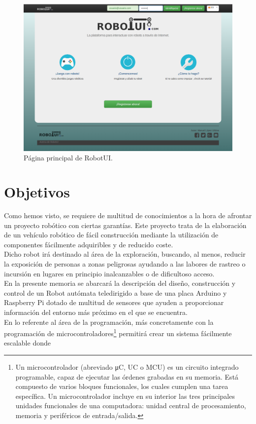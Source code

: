 \begin{figure}[H]
  \begin{center}
    \includegraphics[scale=0.3]{imagenes/manual-usuario/pagina-principal.png}
  \end{center}
  \label{fig:logo}
 \caption{Página principal de RobotUI.}
\end{figure}

\section{Objetivos}
\label{sec:objetivos}

Como hemos visto, se requiere de multitud de conocimientos a la hora de afrontar un proyecto robótico con ciertas garantías. Este proyecto trata de la elaboración 
de un vehículo robótico de fácil construcción mediante la utilización de componentes fácilmente adquiribles y de reducido coste.\\

Dicho robot irá destinado al área de la exploración, buscando, al menos, reducir la exposición de personas a zonas peligrosas ayudando a las labores de rastreo 
o incursión en lugares en principio inalcanzables o de dificultoso acceso.\\

En la presente memoria se abarcará la descripción del diseño, construcción y control de un Robot autómata teledirigido a base de una placa Arduino y Raspberry Pi dotado de multitud de sensores que ayuden a proporcionar 
información del entorno más próximo en el que se encuentra.\\

En lo referente al área de la programación, más concretamente con la programación de microcontroladores\footnote{Un microcontrolador (abreviado μC, UC o MCU) es un circuito integrado programable, capaz de 
ejecutar las órdenes grabadas en su memoria. Está compuesto de varios bloques funcionales, los cuales cumplen una tarea específica. Un microcontrolador incluye en su interior las
tres principales unidades funcionales de una computadora: unidad central de procesamiento, memoria y periféricos de entrada/salida. } permitirá crear un sistema fácilmente escalable
donde 


